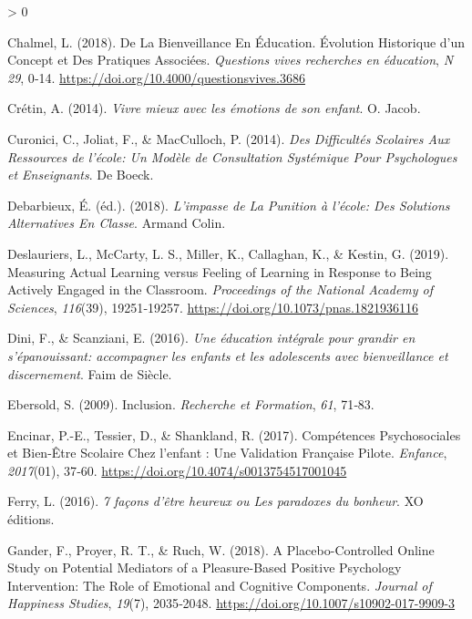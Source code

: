 \documentclass[
  french,
]{article}
\newlength{\cslhangindent}
\newenvironment{CSLReferences}[2] %
 {%
  \setlength{\parindent}{0pt}
  \ifodd #1 \everypar{\setlength{\hangindent}{\cslhangindent}}\ignorespaces\fi
  \ifnum #2 > 0
  \setlength{\parskip}{#2\baselineskip}
  \fi
 }%
 {}
\begin{document}
\begin{CSLReferences}{1}{0}
\leavevmode\hypertarget{ref-chalmel2018}{}%
Chalmel, L. (2018). De La Bienveillance En Éducation. {Évolution} Historique d'un Concept et Des Pratiques Associées. \emph{Questions vives recherches en éducation}, \emph{N{} 29}, 0‑14. \url{https://doi.org/10.4000/questionsvives.3686}

\leavevmode\hypertarget{ref-cretin2014}{}%
Crétin, A. (2014). \emph{{Vivre mieux avec les émotions de son enfant}}. {O. Jacob}.

\leavevmode\hypertarget{ref-curonici2014a}{}%
Curonici, C., Joliat, F., \& MacCulloch, P. (2014). \emph{Des Difficultés Scolaires Aux Ressources de l'école: Un Modèle de Consultation Systémique Pour Psychologues et Enseignants}. {De Boeck}.

\leavevmode\hypertarget{ref-debarbieux2018}{}%
Debarbieux, É. (éd.). (2018). \emph{L'impasse de La Punition à l'école: Des Solutions Alternatives En Classe}. {Armand Colin}.

\leavevmode\hypertarget{ref-deslauriers2019}{}%
Deslauriers, L., McCarty, L. S., Miller, K., Callaghan, K., \& Kestin, G. (2019). Measuring Actual Learning versus Feeling of Learning in Response to Being Actively Engaged in the Classroom. \emph{Proceedings of the National Academy of Sciences}, \emph{116}(39), 19251‑19257. \url{https://doi.org/10.1073/pnas.1821936116}

\leavevmode\hypertarget{ref-dini2016}{}%
Dini, F., \& Scanziani, E. (2016). \emph{{Une éducation intégrale pour grandir en s'épanouissant: accompagner les enfants et les adolescents avec bienveillance et discernement}}. {Faim de Siècle}.

\leavevmode\hypertarget{ref-ebersold2009}{}%
Ebersold, S. (2009).{} {Inclusion}{}. \emph{Recherche et Formation}, \emph{61}, 71‑83.

\leavevmode\hypertarget{ref-encinar2017}{}%
Encinar, P.-E., Tessier, D., \& Shankland, R. (2017). Compétences Psychosociales et Bien-Être Scolaire Chez l'enfant : Une Validation Française Pilote. \emph{Enfance}, \emph{2017}(01), 37‑60. \url{https://doi.org/10.4074/s0013754517001045}

\leavevmode\hypertarget{ref-ferry2016a}{}%
Ferry, L. (2016). \emph{{7 façons d'être heureux ou Les paradoxes du bonheur}}. {XO éditions}.

\leavevmode\hypertarget{ref-gander2018}{}%
Gander, F., Proyer, R. T., \& Ruch, W. (2018). A {Placebo}-{Controlled Online Study} on {Potential Mediators} of a {Pleasure}-{Based Positive Psychology Intervention}: {The Role} of {Emotional} and {Cognitive Components}. \emph{Journal of Happiness Studies}, \emph{19}(7), 2035‑2048. \url{https://doi.org/10.1007/s10902-017-9909-3}


\end{CSLReferences}
\end{document}
